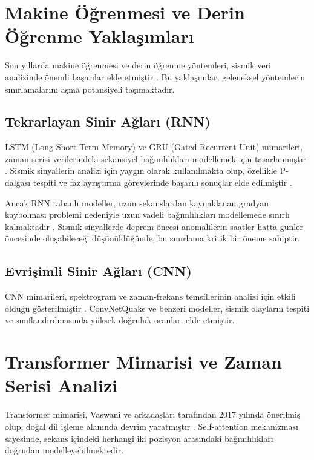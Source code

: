 \section{Makine Öğrenmesi ve Derin Öğrenme Yaklaşımları}

Son yıllarda makine öğrenmesi ve derin öğrenme yöntemleri, sismik veri analizinde önemli başarılar elde etmiştir \cite{kong2019machine}. Bu yaklaşımlar, geleneksel yöntemlerin sınırlamalarını aşma potansiyeli taşımaktadır.

\subsection{Tekrarlayan Sinir Ağları (RNN)}

LSTM (Long Short-Term Memory) ve GRU (Gated Recurrent Unit) mimarileri, zaman serisi verilerindeki sekansiyel bağımlılıkları modellemek için tasarlanmıştır \cite{hochreiter1997long}. Sismik sinyallerin analizi için yaygın olarak kullanılmakta olup, özellikle P-dalgası tespiti ve faz ayrıştırma görevlerinde başarılı sonuçlar elde edilmiştir \cite{ross2018generalized}.

Ancak RNN tabanlı modeller, uzun sekanslardan kaynaklanan gradyan kaybolması problemi nedeniyle uzun vadeli bağımlılıkları modellemede sınırlı kalmaktadır \cite{bengio1994learning}. Sismik sinyallerde deprem öncesi anomalilerin saatler hatta günler öncesinde oluşabileceği düşünüldüğünde, bu sınırlama kritik bir öneme sahiptir.

\subsection{Evrişimli Sinir Ağları (CNN)}

CNN mimarileri, spektrogram ve zaman-frekans temsillerinin analizi için etkili olduğu gösterilmiştir \cite{perol2018convolutional}. ConvNetQuake ve benzeri modeller, sismik olayların tespiti ve sınıflandırılmasında yüksek doğruluk oranları elde etmiştir.

\section{Transformer Mimarisi ve Zaman Serisi Analizi}

Transformer mimarisi, Vaswani ve arkadaşları tarafından 2017 yılında önerilmiş olup, doğal dil işleme alanında devrim yaratmıştır \cite{vaswani2017attention}. Self-attention mekanizması sayesinde, sekans içindeki herhangi iki pozisyon arasındaki bağımlılıkları doğrudan modelleyebilmektedir.

